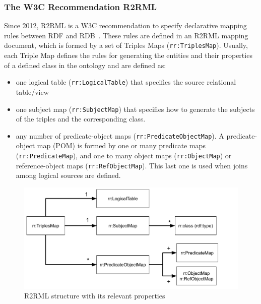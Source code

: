 \subsubsection{The W3C Recommendation R2RML}
Since 2012, R2RML is a W3C recommendation to specify declarative mapping rules between RDF and RDB~\citep{R2RML}. These rules are defined in an R2RML mapping document, which is formed by a set of Triples Maps (\texttt{rr:TriplesMap}). Usually, each Triple Map defines the rules for generating the entities and their properties of a defined class in the ontology and are defined as:
\begin{itemize}
    \item one logical table (\texttt{rr:LogicalTable}) that specifies the source relational table/view
    \item one subject map (\texttt{rr:SubjectMap}) that specifies how to generate the subjects of the triples and the corresponding class.
    \item any number of predicate-object maps (\texttt{rr:PredicateObjectMap}). A predicate-object map (POM) is formed by one or many predicate maps (\texttt{rr:PredicateMap}), and one to many object maps (\texttt{rr:ObjectMap}) or reference-object maps (\texttt{rr:RefObjectMap}). This last one is used when joins among logical sources are defined.
\end{itemize}

\begin{figure}[!t]
\centering
\includegraphics[width=\textwidth]{figures/state-of-the-art/R2RML-structure.pdf}
\caption{R2RML structure with its relevant properties~\citep{R2RML}}
\label{fig:soa_r2rml-structure}
\end{figure}

